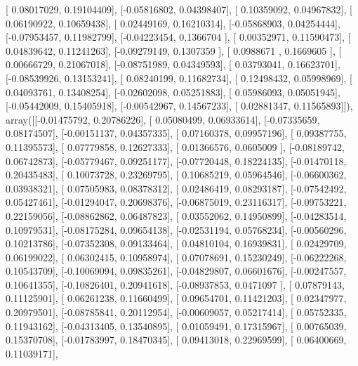 \documentclass{article}
\begin{document}
       [ 0.08017029,  0.19104409],
       [-0.05816802,  0.04398407],
       [ 0.10359092,  0.04967832],
       [ 0.06190922,  0.10659438],
       [ 0.02449169,  0.16210314],
       [-0.05868903,  0.04254444],
       [-0.07953457,  0.11982799],
       [-0.04223454,  0.1366704 ],
       [ 0.00352971,  0.11590473],
       [ 0.04839642,  0.11241263],
       [-0.09279149,  0.1307359 ],
       [ 0.0988671 ,  0.1669605 ],
       [ 0.00666729,  0.21067018],
       [-0.08751989,  0.04349593],
       [ 0.03793041,  0.16623701],
       [-0.08539926,  0.13153241],
       [ 0.08240199,  0.11682734],
       [ 0.12498432,  0.05998969],
       [ 0.04093761,  0.13408254],
       [-0.02602098,  0.05251883],
       [ 0.05986093,  0.05051945],
       [-0.05442009,  0.15405918],
       [-0.00542967,  0.14567233],
       [ 0.02881347,  0.11565893]]), array([[-0.01475792,  0.20786226],
       [ 0.05080499,  0.06933614],
       [-0.07335659,  0.08174507],
       [-0.00151137,  0.04357335],
       [ 0.07160378,  0.09957196],
       [ 0.09387755,  0.11395573],
       [ 0.07779858,  0.12627333],
       [ 0.01366576,  0.0605009 ],
       [-0.08189742,  0.06742873],
       [-0.05779467,  0.09251177],
       [-0.07720448,  0.18224135],
       [-0.01470118,  0.20435483],
       [ 0.10073728,  0.23269795],
       [ 0.10685219,  0.05964546],
       [-0.06600362,  0.03938321],
       [ 0.07505983,  0.08378312],
       [ 0.02486419,  0.08293187],
       [-0.07542492,  0.05427461],
       [-0.01294047,  0.20698376],
       [-0.06875019,  0.23116317],
       [-0.09753221,  0.22159056],
       [-0.08862862,  0.06487823],
       [ 0.03552062,  0.14950899],
       [-0.04283514,  0.10979531],
       [-0.08175284,  0.09654138],
       [-0.02531194,  0.05768234],
       [-0.00560296,  0.10213786],
       [-0.07352308,  0.09133464],
       [ 0.04810104,  0.16939831],
       [ 0.02429709,  0.06199022],
       [ 0.06302415,  0.10958974],
       [ 0.07078691,  0.15230249],
       [-0.06222268,  0.10543709],
       [-0.10069094,  0.09835261],
       [-0.04829807,  0.06601676],
       [-0.00247557,  0.10641355],
       [-0.10826401,  0.20941618],
       [-0.08937853,  0.0471097 ],
       [ 0.07879143,  0.11125901],
       [ 0.06261238,  0.11660499],
       [ 0.09654701,  0.11421203],
       [ 0.02347977,  0.20979501],
       [-0.08785841,  0.20112954],
       [-0.00609057,  0.05217414],
       [ 0.05752335,  0.11943162],
       [-0.04313405,  0.13540895],
       [ 0.01059491,  0.17315967],
       [ 0.00765039,  0.15370708],
       [-0.01783997,  0.18470345],
       [ 0.09413018,  0.22969599],
       [ 0.06400669,  0.11039171],
\end{document}
